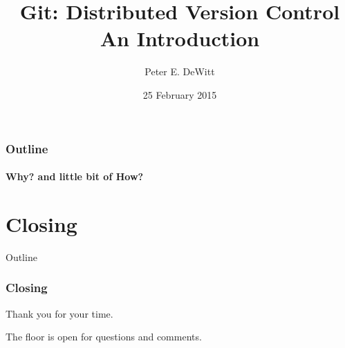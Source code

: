 \ifuseblack
\else
\fi


\author{Peter E. DeWitt}
\title[Intro to Git]{Git: Distributed Version Control \\ {\small An
Introduction}}
\date{25 February 2015}



 
  \watermarkoff

  \begin{frame}[t,plain]
    \titlepage
  \end{frame}

  \begin{frame}[t]
    \frametitle{Outline}
    \framesubtitle{Why? and little bit of How?}
    \tableofcontents[hideallsubsections] 
  \end{frame}




  \section{Closing}
  \begin{frame}[t]{Outline}
  \end{frame}

  \begin{frame}[t] 
    \frametitle{Closing}
    \begin{center}
    Thank you for your time.

    \vspace{1in}

    The floor is open for questions and comments.
    \end{center} 
  \end{frame}



